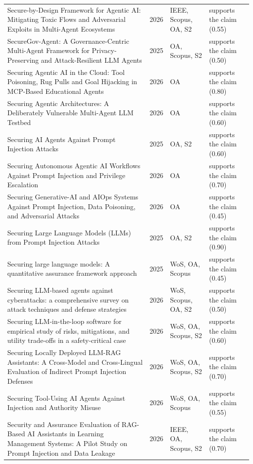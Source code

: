 \begin{longtable}{@{}%
  >{\raggedright\arraybackslash}p{}c%
  >{\raggedright\arraybackslash}p{}%
  >{\raggedright\arraybackslash}p{}@{}}
Secure-by-Design Framework for Agentic AI: Mitigating Toxic Flows and Adversarial Exploits in Multi-Agent Ecosystems & 2026 & IEEE, Scopus, OA, S2 & supports the claim (0.55) \\
SecureGov-Agent: A Governance-Centric Multi-Agent Framework for Privacy-Preserving and Attack-Resilient LLM Agents & 2025 & OA, Scopus, S2 & supports the claim (0.50) \\
Securing Agentic AI in the Cloud: Tool Poisoning, Rug Pulls and Goal Hijacking in MCP-Based Educational Agents & 2026 & OA & supports the claim (0.80) \\
Securing Agentic Architectures: A Deliberately Vulnerable Multi-Agent LLM Testbed & 2026 & OA & supports the claim (0.60) \\
Securing AI Agents Against Prompt Injection Attacks & 2025 & OA, S2 & supports the claim (0.60) \\
Securing Autonomous Agentic AI Workflows Against Prompt Injection and Privilege Escalation & 2026 & OA & supports the claim (0.70) \\
Securing Generative-AI and AIOps Systems Against Prompt Injection, Data Poisoning, and Adversarial Attacks & 2026 & OA & supports the claim (0.45) \\
Securing Large Language Models (LLMs) from Prompt Injection Attacks & 2025 & OA, S2 & supports the claim (0.90) \\
Securing large language models: A quantitative assurance framework approach & 2025 & WoS, OA, Scopus & supports the claim (0.45) \\
Securing LLM-based agents against cyberattacks: a comprehensive survey on attack techniques and defense strategies & 2026 & WoS, Scopus, OA, S2 & supports the claim (0.50) \\
Securing LLM-in-the-loop software for empirical study of risks, mitigations, and utility trade-offs in a safety-critical case & 2026 & WoS, OA, Scopus, S2 & supports the claim (0.60) \\
Securing Locally Deployed LLM-RAG Assistants: A Cross-Model and Cross-Lingual Evaluation of Indirect Prompt Injection Defenses & 2026 & WoS, OA, Scopus, S2 & supports the claim (0.70) \\
Securing Tool-Using AI Agents Against Injection and Authority Misuse & 2026 & WoS, OA, Scopus & supports the claim (0.55) \\
Security and Assurance Evaluation of RAG-Based AI Assistants in Learning Management Systems: A Pilot Study on Prompt Injection and Data Leakage & 2026 & IEEE, OA, Scopus, S2 & supports the claim (0.70) \\

\end{longtable}
